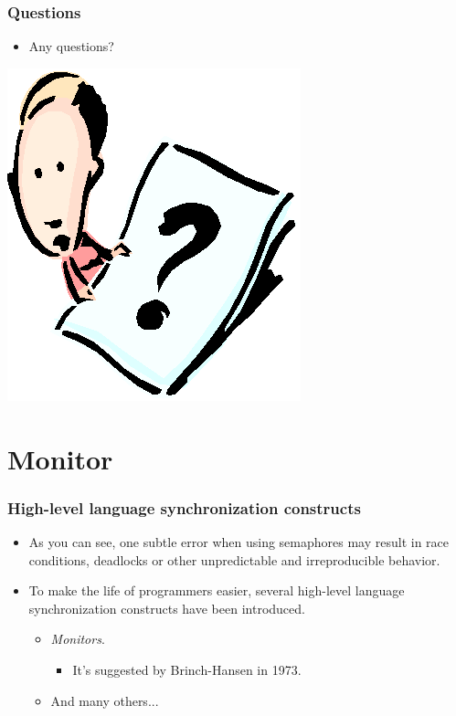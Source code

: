 \documentclass[CJKutf8,xcolor=pdftex,dvipsnames,table]{beamer}
\begin{document}
\begin{CJK*}{UTF8}{song}
  \begin{frame}
  \frametitle{Questions}
  \begin{itemize}
  \item{Any questions?}
  \end{itemize}
  \begin{center}
    \includegraphics[scale=.5]{question}
  \end{center}
  \end{frame}

\section{Monitor}

  \begin{frame}
  \frametitle{High-level language synchronization constructs} \pause
  \begin{itemize}
  \item{As you can see, one subtle error when using semaphores may result in race conditions, deadlocks or other unpredictable and irreproducible behavior.} \pause
  \item{To make the life of programmers easier, several high-level language synchronization constructs have been introduced.} \pause
    \begin{itemize}
   \item{\emph{Monitors}.} \pause
      \begin{itemize}
      \item{It's suggested by Brinch-Hansen in 1973.} \pause
      \end{itemize}
    \item{And many others...}
    \end{itemize}
  \end{itemize}
  \end{frame}



\end{CJK*}
\end{document}
